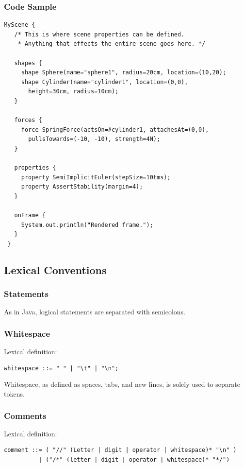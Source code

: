 \subsubsection{Code Sample}

\begin{verbatim}
MyScene {
   /* This is where scene properties can be defined.
    * Anything that effects the entire scene goes here. */
   
   shapes {
     shape Sphere(name="sphere1", radius=20cm, location=(10,20);
     shape Cylinder(name="cylinder1", location=(0,0), 
       height=30cm, radius=10cm);
   }
   
   forces {
     force SpringForce(actsOn=#cylinder1, attachesAt=(0,0), 
       pullsTowards=(-10, -10), strength=4N);
   }
   
   properties {
     property SemiImplicitEuler(stepSize=10tms);
     property AssertStability(margin=4);
   }

   onFrame {
     System.out.println("Rendered frame.");
   }
 }
\end{verbatim}

\subsection{Lexical Conventions}
 
\subsubsection{Statements}
As in Java, logical statements are separated with semicolons.
 
\subsubsection{Whitespace}
Lexical definition:

\begin{verbatim}
whitespace ::= " " | "\t" | "\n";
\end{verbatim}

Whitespace, as defined as spaces, tabs, and new lines, is solely used
to separate tokens.
 
\subsubsection{Comments}
Lexical definition:

\begin{verbatim}
comment ::= ( "//" (Letter | digit | operator | whitespace)* "\n" ) 
          | ("/*" (letter | digit | operator | whitespace)* "*/")
\end{verbatim}

